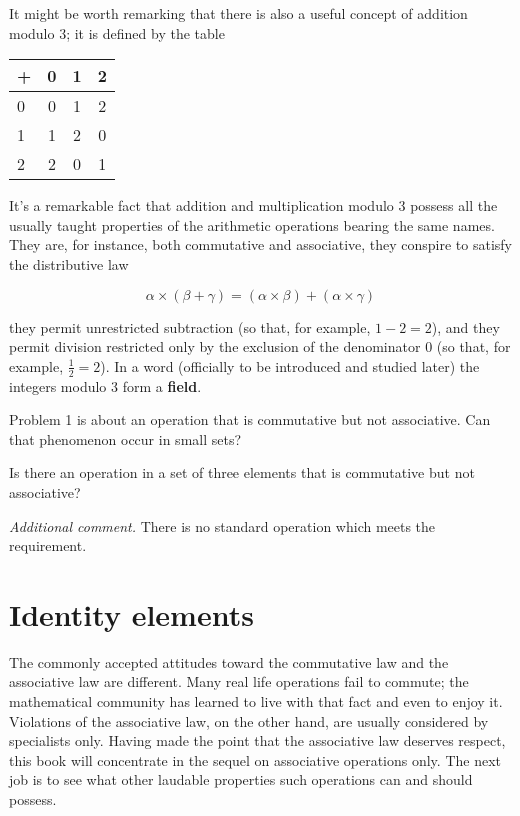 It might be worth remarking that there is also a useful concept of addition modulo 3; it is defined by the table

\begin{center}
    \begin{tabular}{l|ccc}
        + & 0 & 1 & 2 \\
        \hline
        0 & 0 & 1 & 2 \\
        1 & 1 & 2 & 0 \\
        2 & 2 & 0 & 1
    \end{tabular}
\end{center}

It's a remarkable fact that addition and multiplication modulo 3 possess all the usually taught properties of the arithmetic operations bearing the same names. They are, for instance, both commutative and associative, they conspire to satisfy the distributive law

\begin{equation}
    \alpha \times (\beta + \gamma) = (\alpha \times \beta) + (\alpha \times \gamma)
\end{equation}

they permit unrestricted subtraction (so that, for example, $1 - 2 = 2$), and they permit division restricted only by the exclusion of the denominator 0 (so that, for example, $\frac{1}{2} = 2$). In a word (officially to be introduced and studied later) the integers modulo 3 form a \textbf{field}.

Problem 1 is about an operation that is commutative but not associative. Can that phenomenon occur in small sets?

\begin{problem}
Is there an operation in a set of three elements that is commutative but not associative?
\end{problem}

\textit{Additional comment.} There is no standard operation which meets the requirement.

\section{Identity elements}

The commonly accepted attitudes toward the commutative law and the associative law are different. Many real life operations fail to commute; the mathematical community has learned to live with that fact and even to enjoy it. Violations of the associative law, on the other hand, are usually considered by specialists only. Having made the point that the associative law deserves respect, this book will concentrate in the sequel on associative operations only. The next job is to see what other laudable properties such operations can and should possess.

